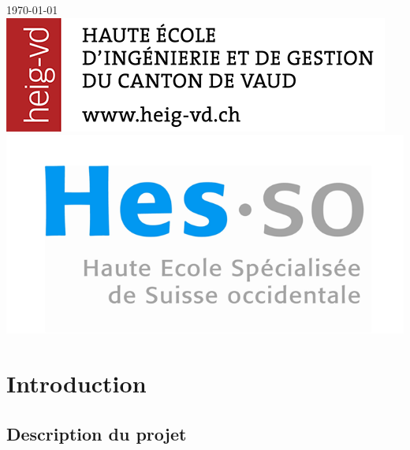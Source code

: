\documentclass[11pt,a4paper,oldfontcommands]{memoir}
\begin{document}
\begin{titlepage}

{\large \today}\\[3cm]


\includegraphics[scale=0.3]{images/heigvd.png}
\hfill
\includegraphics[scale=0.6]{images/hesso.png}

\vfill
\end{titlepage}

\cleardoublepage
\tableofcontents*
\cleardoublepage
\listoffigures*
\cleardoublepage
\listoftables*
\cleardoublepage


\chapter{Introduction}

\section{Description du projet}
\end{document}
